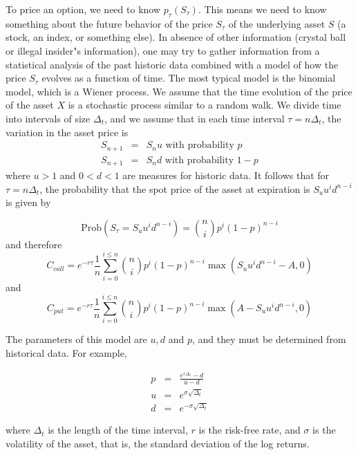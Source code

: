 \documentclass[justified, sixbynine]{tufte-book}
\theoremstyle{plain}%
\newtheorem * {corollary}{Corollary}
\theoremstyle{definition}
\theoremstyle{remark}
\newtheorem * {remark}{Remark}
\newtheorem * {note}{Note}
\begin{document}
\begin{fullwidth}
To price an option, we need to know $p_\tau (S_\tau )$. This means we need to
know something about the future behavior of the price $S_\tau $ of the
underlying asset $S$ (a stock, an index, or something else). In absence of
other information (crystal ball or illegal insider"s information), one may
try to gather information from a statistical analysis of the past historic
data combined with a model of how the price $S_\tau $ evolves as a function of
time. The most typical model is the binomial model, which is a Wiener
process. We assume that the time evolution of the price of the asset $X$ is a
stochastic process similar to a random walk. We divide time into
intervals of size $\Delta _t$, and we assume that in each time interval $\tau
=n\Delta _t$, the variation in the asset price is
\begin{eqnarray}
S_{n+1} &=&S_nu\text{ with probability }p \\
S_{n+1} &=&S_nd\text{ with probability }1-p
\end{eqnarray}
where $u>1$ and $0<d<1$ are measures for historic data. It follows that for $%
\tau =n\Delta _t$, the probability that the spot price of the asset at
expiration is $S_uu^id^{n-i}$ is given by

\begin{equation}
\textrm{Prob}(S_\tau =S_uu^id^{n-i})=\binom nip^i(1-p)^{n-i}
\end{equation}
and therefore
\begin{equation}
C_{call}=e^{-r\tau }\frac 1n\sum_{i=0}^{i\leq n}\binom nip^i(1-p)^{n-i}\max
(S_uu^id^{n-i}-A, 0)  \label{bincall}
\end{equation}
and
\begin{equation}
C_{put}=e^{-r\tau }\frac 1n\sum_{i=0}^{i\leq n}\binom nip^i(1-p)^{n-i}\max
(A-S_uu^id^{n-i}, 0)  \label{binput}
\end{equation}

The parameters of this model are $u, d$ and $p$, and they must be determined
from historical data. For example, 

\begin{eqnarray}
p &=& \frac{e^{r\Delta_t} - d}{u-d} \\
u &=& e^{\sigma\sqrt{\Delta_t}} \\
d &=& e^{-\sigma\sqrt{\Delta_t}}
\end{eqnarray}

where $\Delta_t$ is the length of the time interval, $r$ is the risk-free rate, and $\sigma$ is the volatility of the asset, that is, the standard deviation of the log returns.


\end{fullwidth}
\end{document}

